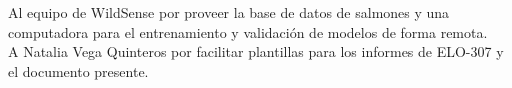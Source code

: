 \pagestyle{fancy}

\begin{thanksnf}
Al equipo de WildSense por proveer la base de datos de salmones y una computadora para el entrenamiento y validación de modelos de forma remota.\\
A Natalia Vega Quinteros por facilitar plantillas para los informes de ELO-307 y el documento presente.
\end{thanksnf}
